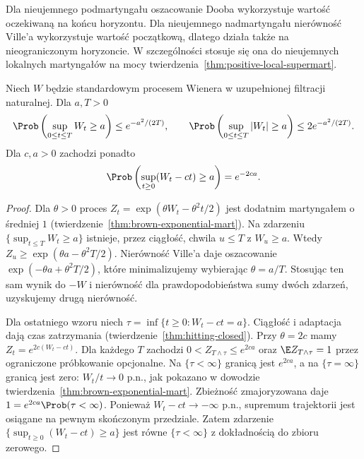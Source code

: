 \begin{uwaga}
Dla nieujemnego podmartyngału oszacowanie
Dooba wykorzystuje wartość oczekiwaną na końcu
horyzontu. Dla nieujemnego nadmartyngału
nierówność Ville'a wykorzystuje wartość
początkową, dlatego działa także na nieograniczonym
horyzoncie. W szczególności stosuje się ona do
nieujemnych lokalnych martyngałów na mocy
twierdzenia~\ref{thm:positive-local-supermart}.
\end{uwaga}

\begin{twierdzenie}
\label{thm:brown-exponential-max}
Niech $W$ będzie standardowym procesem Wienera
w uzupełnionej filtracji naturalnej. Dla $a,T>0$
\[
\Prob\left(\sup_{0\le t\le T} W_t\ge a\right)
\le e^{-a^2/(2T)},\qquad
\Prob\left(\sup_{0\le t\le T}|W_t|\ge a\right)
\le 2e^{-a^2/(2T)}.
\]
Dla $c,a>0$ zachodzi ponadto
\[
\Prob\left(\sup_{t\ge0}(W_t-ct)\ge a\right)
=e^{-2ca}.
\]
\end{twierdzenie}
\begin{proof}
Dla $\theta>0$ proces
$Z_t=\exp(\theta W_t-\theta^2t/2)$
jest dodatnim martyngałem o średniej $1$
(twierdzenie~\ref{thm:brown-exponential-mart}).
Na zdarzeniu $\{\sup_{t\le T}W_t\ge a\}$
istnieje, przez ciągłość, chwila $u\le T$
z $W_u\ge a$. Wtedy
$Z_u\ge\exp(\theta a-\theta^2T/2)$.
Nierówność Ville'a daje oszacowanie
$\exp(-\theta a+\theta^2T/2)$, które
minimalizujemy wybierając $\theta=a/T$.
Stosując ten sam wynik do $-W$ i nierówność
dla prawdopodobieństwa sumy dwóch zdarzeń,
uzyskujemy drugą nierówność.

Dla ostatniego wzoru niech
$\tau=\inf\{t\ge0:W_t-ct=a\}$.
Ciągłość i adaptacja dają czas zatrzymania
(twierdzenie~\ref{thm:hitting-closed}).
Przy $\theta=2c$ mamy $Z_t=e^{2c(W_t-ct)}$.
Dla każdego $T$ zachodzi
$0<Z_{T\wedge\tau}\le e^{2ca}$ oraz
$\E Z_{T\wedge\tau}=1$ przez ograniczone
próbkowanie opcjonalne.
Na $\{\tau<\infty\}$ granicą jest $e^{2ca}$,
a na $\{\tau=\infty\}$ granicą jest zero:
$W_t/t\to0$ p.n., jak pokazano w dowodzie
twierdzenia~\ref{thm:brown-exponential-mart}.
Zbieżność zmajoryzowana daje
$1=e^{2ca}\Prob(\tau<\infty)$.
Ponieważ $W_t-ct\to-\infty$ p.n.,
supremum trajektorii jest osiągane na pewnym
skończonym przedziale. Zatem zdarzenie
$\{\sup_{t\ge0}(W_t-ct)\ge a\}$ jest równe
$\{\tau<\infty\}$ z dokładnością do zbioru zerowego.
\end{proof}

